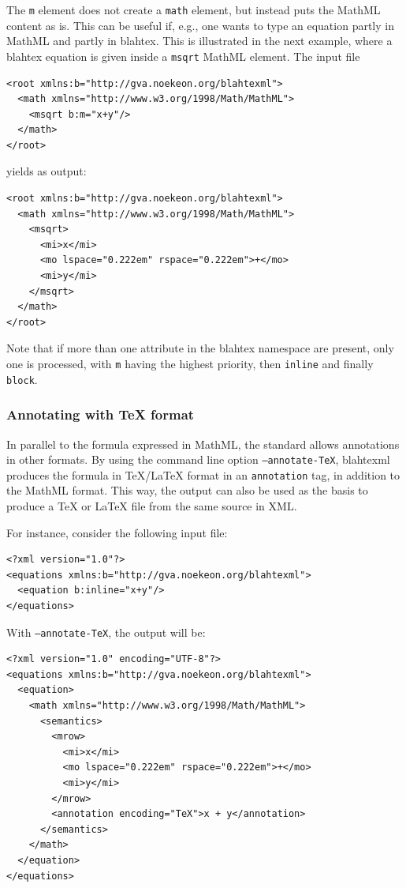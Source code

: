 \documentclass{article}
\begin{document}
The \texttt{m} element does not create a \texttt{math} element, but instead puts the MathML content as is. This can be useful if, e.g., one wants to type an equation partly in MathML and partly in blahtex. This is illustrated in the next example, where a blahtex equation is given inside a \texttt{msqrt} MathML element. The input file
\begin{verbatim}
<root xmlns:b="http://gva.noekeon.org/blahtexml">
  <math xmlns="http://www.w3.org/1998/Math/MathML">
    <msqrt b:m="x+y"/>
  </math>
</root>
\end{verbatim}
yields as output:
\begin{verbatim}
<root xmlns:b="http://gva.noekeon.org/blahtexml">
  <math xmlns="http://www.w3.org/1998/Math/MathML">
    <msqrt>
      <mi>x</mi>
      <mo lspace="0.222em" rspace="0.222em">+</mo>
      <mi>y</mi>
    </msqrt>
  </math>
</root>
\end{verbatim}

Note that if more than one attribute in the blahtex namespace are present, only one is processed, with \texttt{m} having the highest priority, then \texttt{inline} and finally \texttt{block}.

\subsubsection{Annotating with \TeX{} format}

In parallel to the formula expressed in MathML, the standard allows annotations in other formats. By using the command line option \texttt{--annotate-TeX}, blahtexml produces the formula in \TeX/\LaTeX{} format in an \texttt{annotation} tag, in addition to the MathML format. This way, the output can also be used as the basis to produce a \TeX{} or \LaTeX{} file from the same source in XML.

For instance, consider the following input file:
\begin{verbatim}
<?xml version="1.0"?>
<equations xmlns:b="http://gva.noekeon.org/blahtexml">
  <equation b:inline="x+y"/>
</equations>
\end{verbatim}
With \texttt{--annotate-TeX}, the output will be:
\begin{verbatim}
<?xml version="1.0" encoding="UTF-8"?>
<equations xmlns:b="http://gva.noekeon.org/blahtexml">
  <equation>
    <math xmlns="http://www.w3.org/1998/Math/MathML">
      <semantics>
        <mrow>
          <mi>x</mi>
          <mo lspace="0.222em" rspace="0.222em">+</mo>
          <mi>y</mi>
        </mrow>
        <annotation encoding="TeX">x + y</annotation>
      </semantics>
    </math>
  </equation>
</equations>
\end{verbatim}
\end{document}
